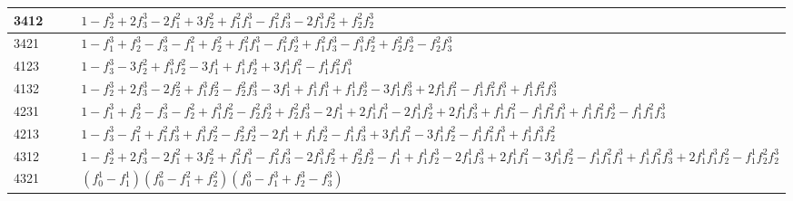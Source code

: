 \documentclass[11pt]{article}
\begin{document}
\begin{table}[!h]
\begin{tabular}{|p{2cm}|p{6cm}|p{2cm}|p{6cm}|}
3412 & & & $1 - f_2^3 + 2f_3^3 - 2f_1^2 + 3f_2^2 + f_1^2f_1^3 - f_1^2f_3^3 - 2f_1^3f_2^2 + f_2^2f_2^3$ \\ \hline
3421 & & & $1 - f_1^3 + f_2^3 - f_3^3 - f_1^2 + f_2^2 + f_1^2f_1^3 - f_1^2f_2^3 + f_1^2f_3^3 - f_1^3f_2^2 + f_2^2f_2^3 - f_2^2f_3^3$\\ \hline
4123 & & & $1 - f_3^3 - 3f_2^2 + f_1^3f_2^2 - 3f_1^1 + f_1^1f_2^3 + 3f_1^1f_1^2 - f_1^1f_1^2f_1^3$\\ \hline
4132 & & & $1 - f_2^3 + 2f_3^3 - 2f_2^2 + f_1^3f_2^2 - f_2^2f_3^3 - 3f_1^1 + f_1^1f_1^3 + f_1^1f_2^3 - 3f_1^1f_3^3 + 2f_1^1f_1^2 - f_1^1f_1^2f_1^3 + f_1^1f_1^2f_3^3$\\ \hline
4231 & & & $1 - f_1^3 + f_2^3 - f_3^3 - f_2^2 + f_1^3f_2^2 - f_2^2f_2^3 + f_2^2f_3^3 - 2f_1^1 + 2f_1^1f_1^3 - 2f_1^1f_2^3 + 2f_1^1f_3^3 + f_1^1f_1^2 - f_1^1f_1^2f_1^3 + f_1^1f_1^2f_2^3 - f_1^1f_1^2f_3^3$\\ \hline
4213 & & & $1 - f_3^3 - f_1^2 + f_1^2f_3^3 + f_1^3f_2^2 - f_2^2f_2^3 - 2f_1^1 + f_1^1f_2^3 - f_1^1f_3^3 + 3f_1^1f_1^2 - 3f_1^1f_2^2 - f_1^1f_1^2f_1^3 + f_1^1f_1^3f_2^2$\\ \hline
4312 & & & $1 - f_2^3 + 2f_3^3 - 2f_1^2 + 3f_2^2 + f_1^2f_1^3 - f_1^2f_3^3 - 2f_1^3f_2^2 + f_2^2f_2^3 - f_1^1 + f_1^1f_2^3 - 2f_1^1f_3^3 + 2f_1^1f_1^2 - 3f_1^1f_2^2 - f_1^1f_1^2f_1^3 + f_1^1f_1^2f_3^3 + 2f_1^1f_1^3f_2^2 - f_1^1f_2^2f_2^3$\\ \hline
4321 & & & $(f_0^1 - f_1^1)(f_0^2 - f_1^2 + f_2^2)(f_0^3 - f_1^3 + f_2^3 - f_3^3)$\\ \hline
\end{tabular}
\end{table}
\end{document}
